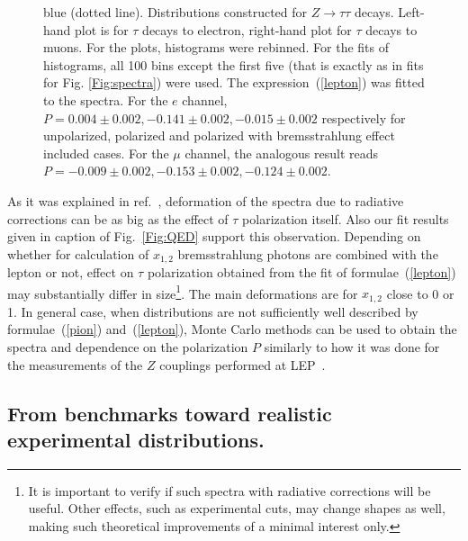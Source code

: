 \documentclass{article}
\begin{document}
\begin{figure}[h!]
{blue (dotted line). Distributions constructed for $Z \to \tau \tau$ decays.
Left-hand plot is for $\tau$ decays to electron, right-hand plot for
$\tau$ decays to muons. For the plots, histograms were rebinned. 
For the fits of histograms,  all 100 bins  except 
the first five (that is exactly as  in fits for Fig. \ref{Fig:spectra})  were used.
The expression~(\ref{lepton}) was fitted to the spectra.
For the $e$ channel, 
$P= 0.004\pm 0.002, -0.141 \pm 0.002, -0.015 \pm 0.002$ 
respectively for
unpolarized, polarized and polarized with bremsstrahlung effect included cases.
For the $\mu$ channel, the  analogous result reads  
$P= -0.009 \pm 0.002, -0.153 \pm 0.002, -0.124 \pm 0.002$.   }
\end{figure}


As it was explained in ref.~\cite{Eberhard:1989ve}, deformation of the spectra due to  radiative 
corrections   can be as big as the effect of 
$\tau$ polarization itself. Also our fit results given in caption of Fig.~\ref{Fig:QED} support this observation. 
Depending on whether for calculation of  $x_{1,2}$ bremsstrahlung photons   are 
combined with the lepton or not,  effect on $\tau$ polarization obtained  from the 
fit of formulae~(\ref{lepton})  may substantially differ in size\footnote{
It is  important to verify if such spectra with radiative corrections
will be useful. Other effects, such as experimental cuts,
may change shapes  as well,
making such theoretical improvements of a minimal interest only. }. 
The main deformations are for $x_{1,2}$ close to 0 or 1.
In general case, when distributions are not sufficiently well described 
by formulae~(\ref{pion}) and~(\ref{lepton}), Monte Carlo methods can be used to obtain the spectra and dependence 
on the polarization $P$  similarly to how it was done for the   measurements  of the $Z$ couplings
performed at LEP~\cite{Heister:2001uh}. 

\subsection{From benchmarks toward realistic experimental distributions.}
\end{document}
